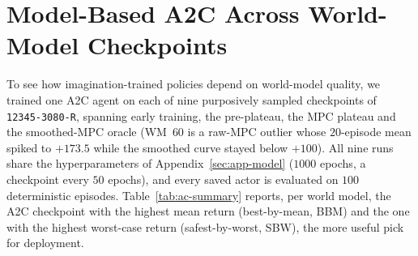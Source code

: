 \documentclass[11pt]{article}
\theoremstyle{remark}
\begin{document}
\section{Model-Based A2C Across World-Model Checkpoints}
\label{sec:app-ac}

To see how imagination-trained policies depend on world-model quality, we trained one A2C agent on each of nine purposively sampled checkpoints of \texttt{12345-3080-R}, spanning early training, the pre-plateau, the MPC plateau and the smoothed-MPC oracle (WM~$60$ is a raw-MPC outlier whose $20$-episode mean spiked to $+173.5$ while the smoothed curve stayed below $+100$). All nine runs share the hyperparameters of Appendix~\ref{sec:app-model} ($1000$ epochs, a checkpoint every $50$ epochs), and every saved actor is evaluated on $100$ deterministic episodes. Table~\ref{tab:ac-summary} reports, per world model, the A2C checkpoint with the highest mean return (best-by-mean, BBM) and the one with the highest worst-case return (safest-by-worst, SBW), the more useful pick for deployment.
\end{document}
